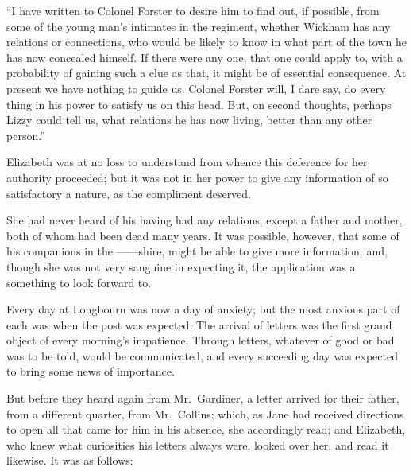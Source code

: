 “I have written to Colonel Forster to desire him to
find out, if possible, from some of the young man’s intimates
in the regiment, whether Wickham has any relations
or connections, who would be likely to know in what part
of the town he has now concealed himself. If there were
any one, that one could apply to, with a probability of
gaining such a clue as that, it might be of essential consequence.
At present we have nothing to guide us. Colonel
Forster will, I dare say, do every thing in his power to
satisfy us on this head. But, on second thoughts, perhaps
Lizzy could tell us, what relations he has now living,
better than any other person.”

Elizabeth was at no loss to understand from whence
this deference for her authority proceeded; but it was
not in her power to give any information of so satisfactory
a nature, as the compliment deserved.

She had never heard of his having had any relations,
except a father and mother, both of whom had been dead
many years. It was possible, however, that some of his
companions in the \hbox{------shire}, might be able to give
more information; and, though she was not very sanguine
in expecting it, the application was a something to look
forward to.

Every day at Longbourn was now a day of anxiety;
but the most anxious part of each was when the post
was expected. The arrival of letters was the first grand
object of every morning’s impatience. Through letters,
whatever of good or bad was to be told, would be communicated,
and every succeeding day was expected to
bring some news of importance.

But before they heard again from Mr.\ Gardiner, a letter
arrived for their father, from a different quarter, from
Mr.\ Collins; which, as Jane had received directions to
open all that came for him in his absence, she accordingly
read; and Elizabeth, who knew what curiosities his letters
always were, looked over her, and read it likewise. It was
as follows:


